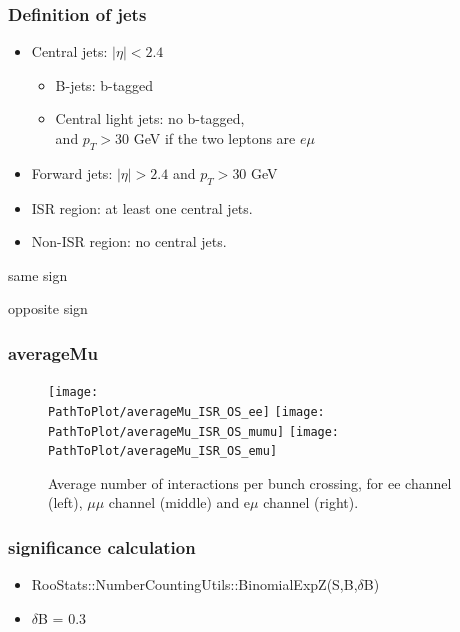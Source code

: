 \documentclass[mathserif,serif]{beamer}
\begin{document}
\begin{frame}
\frametitle{Definition of jets}
\normalsize
\begin{itemize}
\item Central jets: $|\eta|<2.4$
\begin{itemize}
\item B-jets: b-tagged
\item Central light jets: no b-tagged,\\
and $p_T>30$ GeV if the two leptons are $e\mu$
\end{itemize}
\item Forward jets: $|\eta|>2.4$ and $p_T>30$ GeV
\item ISR region: at least one central jets.
\item Non-ISR region: no central jets.
\end{itemize}
\end{frame}

\begin{frame}
\begin{center}
\huge
same sign
\end{center}
\end{frame}




\begin{frame}
\begin{center}
\huge
opposite sign
\end{center}
\end{frame}




\def \PathToPlot {../plot}
\begin{frame}
\frametitle{averageMu}
\begin{figure}
\texttt{[image: \\PathToPlot/averageMu\_ISR\_OS\_ee]}
\texttt{[image: \\PathToPlot/averageMu\_ISR\_OS\_mumu]}
\texttt{[image: \\PathToPlot/averageMu\_ISR\_OS\_emu]} \\
\caption{Average number of interactions per bunch crossing, for ee channel (left), $\mu\mu$ channel (middle) and e$\mu$ channel (right).}
\end{figure}
\end{frame}

\begin{frame}
\frametitle{significance calculation}
\begin{itemize}
\item RooStats::NumberCountingUtils::BinomialExpZ(S,B,$\delta$B)
\item $\delta$B = 0.3
\end{itemize}
\end{frame}
\end{document}
